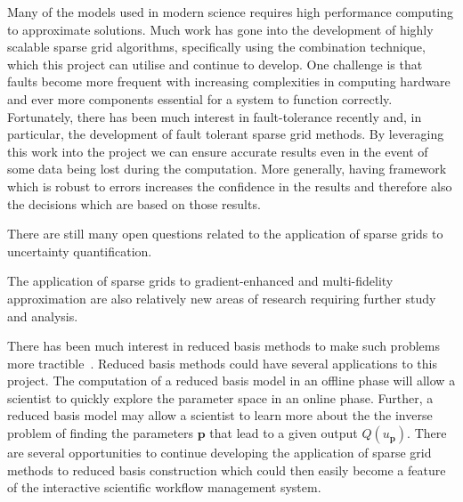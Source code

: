 \documentclass[a4paper,fontsize=12pt]{scrartcl}
\begin{document}
Many of the models used in modern science requires high performance computing
to approximate solutions. Much work has gone into the development 
of highly scalable sparse grid algorithms, specifically using the combination 
technique, which this project can utilise and continue to develop. 
One challenge is that faults become more frequent with increasing 
complexities in computing hardware and ever more components essential 
for a system to function correctly. Fortunately, there has been much interest in 
fault-tolerance recently and, in particular, the development of fault tolerant 
sparse grid methods. By leveraging this work into the project we can ensure
accurate results even in the event of some data being lost during the computation.
More generally, having framework which is robust to errors increases the confidence 
in the results and therefore also the decisions which are based on those results.

There are still many open questions related to the application of 
sparse grids to uncertainty quantification. 


The application of sparse grids to gradient-enhanced and multi-fidelity 
approximation are also relatively new areas of research requiring 
further study and analysis.


There has been much interest in reduced basis methods to make such
problems more tractible~\cite{LiebermanEtal2010}. 
Reduced basis methods could have several applications to this project.
The computation of a reduced basis model in an offline phase
will allow a scientist to quickly explore the parameter space in an online
phase.
Further, a reduced basis model may allow a scientist to learn more about the 
the inverse problem of finding the parameters $\mathbf{p}$ that lead to a 
given output $Q(u_{\mathbf{p}})$.
There are several opportunities to continue developing the application 
of sparse grid methods to reduced basis construction which could then 
easily become a feature of the interactive scientific workflow management system.
\end{document}
